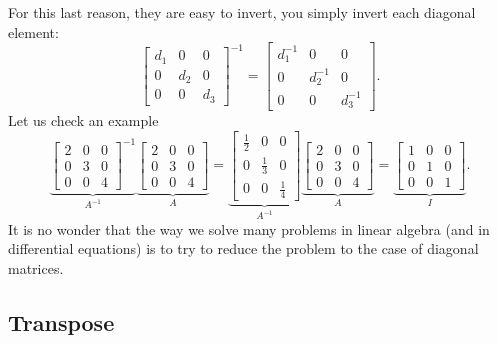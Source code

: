 For this last reason, they are easy to invert, you simply invert
each diagonal element:
\begin{equation*}
\begin{bmatrix}
d_1 & 0 & 0 \\
0 & d_2 & 0 \\
0 & 0 & d_3 
\end{bmatrix}^{-1}
=
\begin{bmatrix}
d_1^{-1} & 0 & 0 \\
0 & d_2^{-1} & 0 \\
0 & 0 & d_3^{-1} 
\end{bmatrix} .
\end{equation*}
Let us check an example
\begin{equation*}
\underbrace{
\begin{bmatrix}
2 & 0 & 0 \\
0 & 3 & 0 \\
0 & 0 & 4 
\end{bmatrix}^{-1}
}_{A^{-1}}
\underbrace{
\begin{bmatrix}
2 & 0 & 0 \\
0 & 3 & 0 \\
0 & 0 & 4 
\end{bmatrix}
}_{A}
=
\underbrace{
\begin{bmatrix}
\frac{1}{2} & 0 & 0 \\
0 & \frac{1}{3} & 0 \\
0 & 0 & \frac{1}{4} 
\end{bmatrix}
}_{A^{-1}}
\underbrace{
\begin{bmatrix}
2 & 0 & 0 \\
0 & 3 & 0 \\
0 & 0 & 4 
\end{bmatrix}
}_{A}
=
\underbrace{
\begin{bmatrix}
1 & 0 & 0 \\
0 & 1 & 0 \\
0 & 0 & 1 
\end{bmatrix}
}_{I} .
\end{equation*}
It is no wonder that the way we solve many problems in linear algebra
(and in differential equations) is to try to reduce the problem to the
case of diagonal matrices.

\subsection{Transpose}

